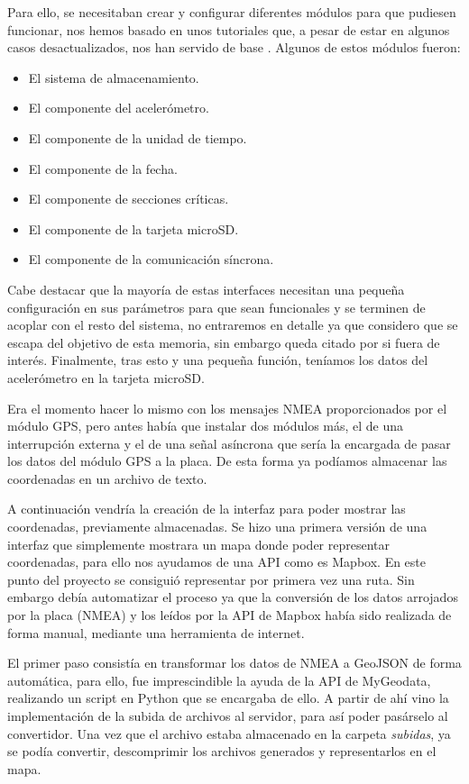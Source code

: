 Para ello, se necesitaban crear y configurar diferentes módulos para que pudiesen funcionar, nos hemos basado en unos tutoriales que, a pesar de estar en algunos casos desactualizados, nos han servido de base \cite{tutorial}. Algunos de estos módulos fueron: 
\begin{itemize}
\tightlist
\item
	El sistema de almacenamiento.
\item
	El componente del acelerómetro.
\item
	El componente de la unidad de tiempo.	
\item
	El componente de la fecha.
\item
	El componente de secciones críticas.
\item
	El componente de la tarjeta microSD.
\item
	El componente de la comunicación síncrona.
\end{itemize}
Cabe destacar que la mayoría de estas interfaces necesitan una pequeña configuración en sus parámetros para que sean funcionales y se terminen de acoplar con el resto del sistema, no entraremos en detalle ya que considero que se escapa del objetivo de esta memoria, sin embargo queda citado por si fuera de interés\cite{tutorial}.
Finalmente, tras esto y una pequeña función, teníamos los datos del acelerómetro en la tarjeta microSD. 

Era el momento hacer lo mismo con los mensajes NMEA proporcionados por el módulo GPS, pero antes había que instalar dos módulos más\cite{tutorial2}, el de una interrupción externa y el de una señal asíncrona que sería la encargada de pasar los datos del módulo GPS a la placa. De esta forma ya podíamos almacenar las coordenadas en un archivo de texto.

A continuación vendría la creación de la interfaz para poder mostrar las coordenadas, previamente almacenadas.
Se hizo una primera versión de una interfaz que simplemente mostrara un mapa donde poder representar coordenadas, para ello nos ayudamos de una API como es Mapbox. En este punto del proyecto se consiguió representar por primera vez una ruta. Sin embargo debía automatizar el proceso ya que la conversión de los datos arrojados por la placa (NMEA) y los leídos por la API de Mapbox había sido realizada de forma manual, mediante una herramienta de internet. 

El primer paso consistía en transformar los datos de NMEA a GeoJSON de forma automática, para ello, fue imprescindible la ayuda de la API de MyGeodata, realizando un script en Python que se encargaba de ello.
A partir de ahí vino la implementación de la subida de archivos al servidor, para así poder pasárselo al convertidor. Una vez que el archivo estaba almacenado en la carpeta \textit{subidas}, ya se podía convertir, descomprimir los archivos generados y representarlos en el mapa. 

